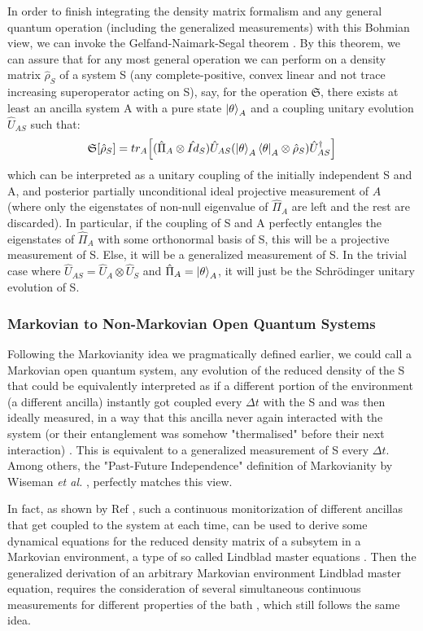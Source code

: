 \documentclass[11pt, a4paper]{article} %
\begin{document}
In order to finish integrating the density matrix formalism and any general quantum operation (including the generalized measurements) with this Bohmian view, we can invoke the Gelfand-Naimark-Segal theorem \cite{GNSTheorem, Generalized}. By this theorem, we can assure that for any most general operation we can perform on a density matrix $\hat{\rho}_S$ of a system S (any complete-positive, convex linear and not trace increasing superoperator acting on S), say, for the operation $\mathfrak{S}$, there exists at least an ancilla system A with a pure state $\ket{\theta}_A$ and a coupling unitary evolution $\hat{U}_{AS}$ such that:
\begin{equation}
\mathfrak{S}[\hat{\rho}_S]=tr_A\qty[ (\hat{\Pi}_A\otimes \hat{Id}_S)  \hat{U}_{AS}\qty(\ket{\theta}_A\bra{\theta}_A\otimes \hat{\rho}_S)\hat{U}_{AS}^\dagger]
\end{equation}
which can be interpreted as a unitary coupling of the initially independent S and A, and posterior partially unconditional ideal projective measurement of $A$ (where only the eigenstates of non-null eigenvalue of $\hat{\Pi}_A$ are left and the rest are discarded). In particular, if the coupling of S and A perfectly entangles the eigenstates of $\hat{\Pi}_A$ with some orthonormal basis of S, this will be a projective measurement of S. Else, it will be a generalized measurement of S. In the trivial case where $\hat{U}_{AS}=\hat{U}_A\otimes\hat{U}_S$ and $\hat{\Pi}_A=\ket{\theta}_A$, it will just be the Schrödinger unitary evolution of S.


\subsubsection*{Markovian to Non-Markovian Open Quantum Systems}
Following the Markovianity idea we pragmatically defined earlier, we could call a Markovian open quantum system, any evolution of the reduced density of the S that could be equivalently interpreted as if a different portion of the environment (a different ancilla) instantly got coupled every $\Delta t$ with the S and was then ideally measured, in a way that this ancilla never again interacted with the system (or their entanglement was somehow "thermalised" before their next interaction) \cite{QuantumTrajs}. This is equivalent to a generalized measurement of S every $\Delta t$. Among others, the "Past-Future Independence" definition of Markovianity by Wiseman {\em et al.} \cite{MarkovianityDefs}, perfectly matches this view.

In fact, as shown by Ref \cite{continousMeas}, such a continuous monitorization of different ancillas that get coupled to the system at each time, can be used to derive some dynamical equations for the reduced density matrix of a subsytem in a Markovian environment, a type of so called Lindblad master equations \cite{Generalized, MarkovianityDefs}. Then the generalized derivation of an arbitrary Markovian environment Lindblad master equation, requires the consideration of several simultaneous continuous measurements for different properties of the bath \cite{continousMeas, MarkovianityDefs}, which still follows the same idea.
\end{document}
